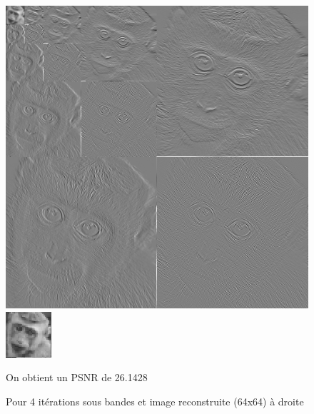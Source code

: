 \documentclass{article}
\begin{document}
\begin{figure}[h!]
\centerline{ \includegraphics[scale=0.5]{./rendus/4sousBandes4iterPGM.png} \includegraphics[scale=4]{./rendus/Reconstruite4.png} }
\caption{Pour 4 itérations  sous bandes et image reconstruite (64x64) à droite} 
On obtient un PSNR de 26.1428
\end{figure}
\end{document}
